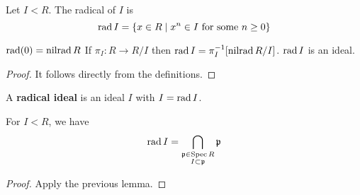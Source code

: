 \begin{defn}[0.13]
	Let $I<R$.
	The radical of $I$ is
	\[\operatorname{rad} I = \{x \in R \mid x^n \in I \text{ for some } n \geq 0\}\]
\end{defn}

\begin{lem}[0.14]
	\begin{enum}
		\io $\operatorname{rad} (0) = \operatorname{nilrad} R$
		\io If $\pi_I: R \to R/I$ then $\operatorname{rad} I = \pi_I^{-1}[\operatorname{nilrad} R/I]$.
		\io $\operatorname{rad} I$ is an ideal.
	\end{enum}
\end{lem}

\begin{proof}
	It follows directly from the definitions.
\end{proof}

\begin{defn}[0.15]
	A \textbf{radical ideal} is an ideal $I$ with $I = \operatorname{rad} I$.
\end{defn}

\begin{lem}[0.16]
	For $I<R$, we have
	\[\operatorname{rad} I = \bigcap_{\substack{\mathfrak p \in \operatorname{Spec} R \\ I \subset \mathfrak p}} \mathfrak p\]
\end{lem}

\begin{proof}
	Apply the previous lemma.
\end{proof}